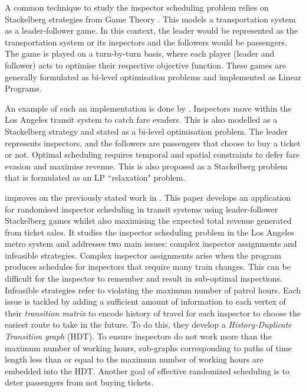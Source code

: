 \documentclass[11pt]{article}
\begin{document}
A common technique to study the inspector scheduling problem relies on Stackelberg strategies from Game Theory \cite{osborne1994course}. This models a transportation system as a leader-follower game. In this context, the leader would be represented as the transportation system or its inspectors and the followers would be passengers. The game is played on a turn-by-turn basis, where each player (leader and follower) acts to optimise their respective objective function. These games are generally formulated as bi-level optimisation problems and implemented as Linear Programs.

An example of such an implementation is done by \citet{jiang_sandholm_2012}. Inspectors move within the Los Angeles transit system to catch fare evaders. This is also modelled as a Stackelberg strategy and stated as a bi-level optimisation problem. The leader represents inspectors, and the followers are passengers that choose to buy a ticket or not. Optimal scheduling requires temporal and spatial constraints to defer fare evasion and maximise revenue. This is also proposed as a Stackelberg problem that is formulated as an LP ``relaxation" problem.

\citet{yin_sullivan_2012} improves on the previously stated work in \cite{jiang_sandholm_2012}. This paper develops an application for randomised inspector scheduling in transit systems using leader-follower Stackelberg games whilst also maximising the expected total revenue generated from ticket sales. It studies the inspector scheduling problem in the Los Angeles metro system and addresses two main issues: complex inspector assignments and infeasible strategies. Complex inspector assignments arise when the program produces schedules for inspectors that require many train changes. This can be difficult for the inspector to remember and result in sub-optimal inspections. Infeasible strategies refer to violating the maximum number of patrol hours. Each issue is tackled by adding a sufficient amount of information to each vertex of their \textit{transition matrix} to encode history of travel for each inspector to choose the easiest route to take in the future. To do this, they develop a \textit{History-Duplicate Transition graph} (HDT). To ensure inspectors do not work more than the maximum number of working hours, sub-graphs corresponding to paths of time length less than or equal to the maximum number of working hours are embedded into the HDT. Another goal of effective randomized scheduling is to deter passengers from not buying tickets.
\end{document}

